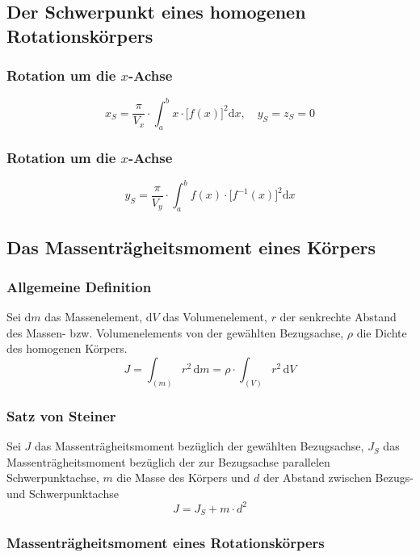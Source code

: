 \subsection{Der Schwerpunkt eines homogenen Rotationskörpers}
\subsubsection{Rotation um die $x$-Achse}
\begin{equation}
\boxed{x_S=\dfrac{\pi}{V_x}\cdot \displaystyle \int_a^bx\cdot \Big[f\left(x\right)\Big]^2\text{d}x,\quad y_S=z_S=0}
\end{equation}
\subsubsection{Rotation um die $x$-Achse}
\begin{equation}
\boxed{y_S=\dfrac{\pi}{V_y}\cdot \displaystyle \int_a^bf\left(x\right)\cdot \Big[f^{-1}\left(x\right)\Big]^2\text{d}x}
\end{equation}
\subsection{Das Massenträgheitsmoment eines Körpers}
\subsubsection{Allgemeine Definition}
Sei $\text{d}m$ das Massenelement, $\text{d}V$ das Volumenelement, $r$ der senkrechte Abstand des Massen- bzw. Volumenelements von der gewählten Bezugsachse, $\rho$ die Dichte des homogenen Körpers.
\begin{equation}
\boxed{J=\displaystyle \int_{\left(m\right)}r^2\,\text{d}m=\rho\cdot \displaystyle \int_{\left(V\right)}r^2\,\text{d}V}
\end{equation}
\subsubsection{Satz von Steiner}
Sei $J$ das Massenträgheitsmoment bezüglich der gewählten Bezugsachse, $J_S$ das Massenträgheitsmoment bezüglich der zur Bezugsachse parallelen Schwerpunktachse, $m$ die Masse des Körpers und $d$ der Abstand zwischen Bezugs- und Schwerpunktachse
\begin{equation}
\boxed{J=J_S+m\cdot d^2}
\end{equation}
\subsubsection{Massenträgheitsmoment eines Rotationskörpers}
